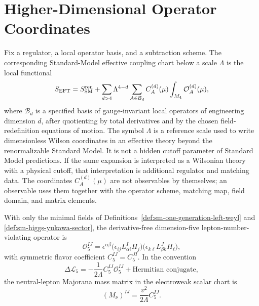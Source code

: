 \section{Higher-Dimensional Operator Coordinates}

\begin{definition}
\label{def:sm-smeft-coupling-chart}
Fix a regulator, a local operator basis, and a subtraction scheme.  The
corresponding Standard-Model effective coupling chart below a scale
\(\Lambda\) is the local functional
\begin{equation}
  S_{\rm EFT}
  =
  S_{\rm SM}^{\rm ren}
  +
  \sum_{d>4}\Lambda^{4-d}
  \sum_{A\in\mathcal B_d} C_A^{(d)}(\mu)
  \int_{M_4}\mathcal O_A^{(d)}(\mu),
  \label{eq:sm-smeft-coupling-chart}
\end{equation}
where \(\mathcal B_d\) is a specified basis of gauge-invariant local
operators of engineering dimension \(d\), after quotienting by total
derivatives and by the chosen field-redefinition equations of motion.  The
symbol \(\Lambda\) is a reference scale used to write dimensionless Wilson
coordinates in an effective theory beyond the renormalizable Standard Model.
It is not a hidden cutoff parameter of Standard Model predictions.  If the
same expansion is interpreted as a Wilsonian theory with a physical cutoff,
that interpretation is additional regulator and matching data.  The
coordinates \(C_A^{(d)}(\mu)\) are not observables by themselves; an
observable uses them together with the operator scheme, matching map, field
domain, and matrix elements.
\end{definition}

\begin{definition}
\label{def:sm-weinberg-operator}
With only the minimal fields of
Definitions~\ref{def:sm-one-generation-left-weyl} and
\ref{def:sm-higgs-yukawa-sector}, the derivative-free dimension-five
lepton-number-violating operator is
\begin{equation}
  \mathcal O_5^{IJ}
  =
  \epsilon^{\alpha\beta}
  \bigl(\epsilon_{ij}L^I_{\alpha i}H_j\bigr)
  \bigl(\epsilon_{k\ell}L^J_{\beta k}H_\ell\bigr),
  \label{eq:sm-weinberg-operator}
\end{equation}
with symmetric flavor coefficient \(C_5^{IJ}=C_5^{JI}\).  In the convention
\begin{equation}
  \Delta\mathcal L_5
  =
  -\frac{1}{2\Lambda}C_5^{IJ}\mathcal O_5^{IJ}
  +\text{Hermitian conjugate},
  \label{eq:sm-weinberg-lagrangian-convention}
\end{equation}
the neutral-lepton Majorana mass matrix in the electroweak scalar chart is
\begin{equation}
  (M_\nu)^{IJ}=\frac{v^2}{2\Lambda}C_5^{IJ}.
  \label{eq:sm-weinberg-neutrino-mass}
\end{equation}
\end{definition}

